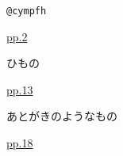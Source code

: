 \hspace*{4mm}
\begin{minipage}{131mm}
    \begin{minipage}{70mm}
        {\tt @cympfh}
    \end{minipage}
    \vspace*{-10mm}
    \begin{flushright}
        \hyperlink{page.2}{pp.2}
    \end{flushright}

    \begin{minipage}{70mm}
        ひもの
    \end{minipage}
    \vspace*{-10mm}
    \begin{flushright}
        \hyperlink{page.13}{pp.13}
    \end{flushright}

    \begin{minipage}{70mm}
        あとがきのようなもの
    \end{minipage}
    \vspace*{-10mm}
    \begin{flushright}
        \hyperlink{page.18}{pp.18}
    \end{flushright}

\end{minipage}
